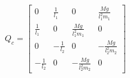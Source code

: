 \documentclass[preview]{standalone}
\begin{document}
\centering $Q_c = \left[\begin{matrix}0 & \frac{1}{l_{1}} & 0 & \frac{M g}{l_{1}^{2} m_{1}}\\\frac{1}{l_{1}} & 0 & \frac{M g}{l_{1}^{2} m_{1}} & 0\\0 & - \frac{1}{l_{2}} & 0 & - \frac{M g}{l_{2}^{2} m_{2}}\\- \frac{1}{l_{2}} & 0 & - \frac{M g}{l_{2}^{2} m_{2}} & 0\end{matrix}\right]$
\end{document}
